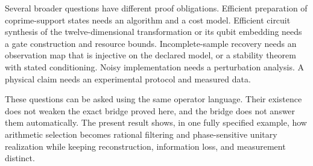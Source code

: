 Several broader questions have different proof obligations. Efficient
preparation of coprime-support states needs an algorithm and a cost
model. Efficient circuit synthesis of the twelve-dimensional
transformation or its qubit embedding needs a gate construction and
resource bounds. Incomplete-sample recovery needs an observation map
that is injective on the declared model, or a stability theorem with
stated conditioning. Noisy implementation needs a perturbation analysis.
A physical claim needs an experimental protocol and measured data.

These questions can be asked using the same operator language. Their
existence does not weaken the exact bridge proved here, and the bridge
does not answer them automatically. The present result shows, in one
fully specified example, how arithmetic selection becomes rational
filtering and phase-sensitive unitary realization while keeping
reconstruction, information loss, and measurement distinct.

